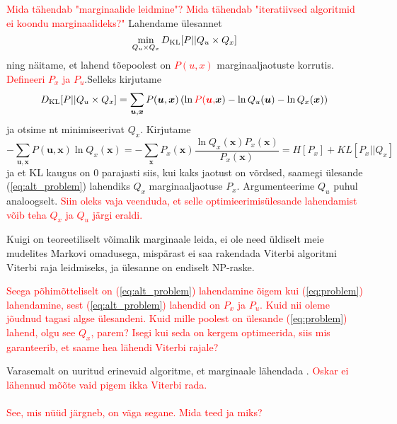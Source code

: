 \textcolor{red}{Mida tähendab "marginaalide leidmine"? Mida tähendab "iteratiivsed algoritmid ei koondu marginaalideks?"}
Lahendame ülesannet
\begin{equation}
    \label{eq:alt_problem}
    \min_{Q_u \times Q_x} D_{\mathrm{KL}}[P || Q_u \times Q_x]
\end{equation}
ning näitame, et lahend tõepoolest on \textcolor{red}{$P(u,x)$} marginaaljaotuste korrutis. \textcolor{red}{Defineeri $P_x$ ja $P_u$}.Selleks kirjutame
$$ D_{\mathrm{KL}}[P || Q_u \times Q_x] = \sum_{\bm{u}, \bm{x}} P(\bm{u},\bm{x}) \left( \ln \textcolor{red}{P(\bm{u},}\bm{x}) - \ln Q_u(\bm{u}) - \ln Q_x(\bm{x}) \right) $$
ja otsime nt minimiseerivat $Q_x$. Kirjutame
$$
-\sum_{\bm{u}, \bm{x}} P(\bm{u},\bm{x}) \ln Q_x(\bm{x}) = -\sum_{\bm{x}} P_x(\bm{x}) \frac{\ln Q_x(\bm{x}) P_x(\bm{x})}{P_x(\bm{x})} = H[P_x] + KL[P_x||Q_x]
$$
ja et KL kaugus on $0$ parajasti siis, kui kaks jaotust on võrdsed, saamegi ülesande (\ref{eq:alt_problem}) lahendiks $Q_x$ marginaaljaotuse $P_x$. Argumenteerime $Q_u$ puhul analoogselt. \textcolor{red}{Siin oleks vaja veenduda, et selle optimieerimisülesande lahendamist võib teha $Q_x$ ja $Q_u$ järgi eraldi.}


Kuigi on teoreetiliselt võimalik marginaale leida, ei ole need üldiselt meie mudelites Markovi omadusega, mispärast ei saa rakendada Viterbi algoritmi Viterbi raja leidmiseks, ja ülesanne on endiselt NP-raske. 

\textcolor{red}{Seega põhimõtteliselt on (\ref{eq:alt_problem}) lahendamine õigem kui (\ref{eq:problem}) lahendamine, sest
(\ref{eq:alt_problem}) lahendid on $P_x$ ja $P_u$. Kuid nii oleme jõudnud tagasi algse ülesandeni. Kuid mille poolest on ülesande (\ref{eq:problem}) lahend, olgu see $Q_x$, parem? Isegi kui seda on kergem optimeerida, siis mis garanteerib, et saame hea lähendi Viterbi rajale?}





Varasemalt on uuritud erinevaid algoritme, et marginaale lähendada \parencite{Soop.2023}.
\textcolor{red}{Oskar ei lähennud mõõte vaid pigem ikka Viterbi rada. 
\\\\
See, mis nüüd järgneb, on väga segane. Mida teed ja miks?}

